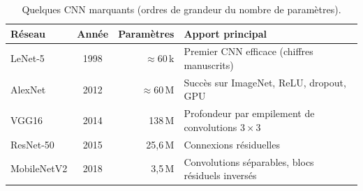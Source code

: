 \begin{table}[H]
\centering
\caption{Quelques CNN marquants (ordres de grandeur du nombre de paramètres).}\label{tab:histoire}
\small
\begin{tabular}{@{}lcrp{6cm}@{}}
\toprule
\textbf{Réseau} & \textbf{Année} & \textbf{Paramètres} & \textbf{Apport principal} \\
\midrule
LeNet-5 & 1998 & $\approx 60$\,k & Premier CNN efficace (chiffres manuscrits) \\
AlexNet & 2012 & $\approx 60$\,M & Succès sur ImageNet, ReLU, dropout, GPU \\
VGG16 & 2014 & 138\,M & Profondeur par empilement de convolutions $3\times3$ \\
ResNet-50 & 2015 & 25,6\,M & Connexions résiduelles \\
MobileNetV2 & 2018 & 3,5\,M & Convolutions séparables, blocs résiduels inversés \\
\bottomrule
\end{tabular}
\end{table}
